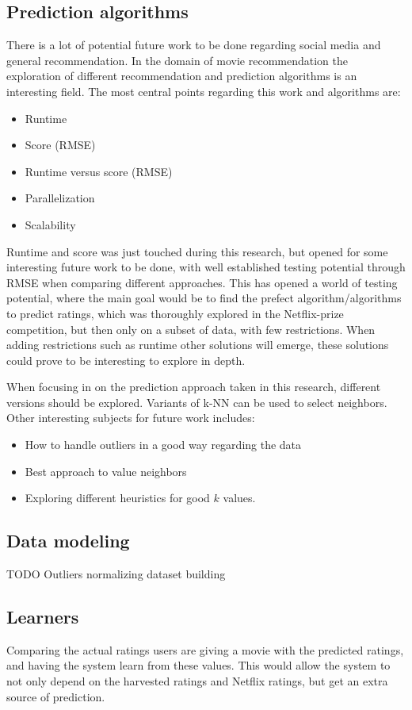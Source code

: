 \subsection{Prediction algorithms}
There is a lot of potential future work to be done regarding social media and general recommendation. In the domain of movie recommendation the exploration of different recommendation and prediction algorithms is an interesting field. The most central points regarding this work and algorithms are:
\begin{itemize}
    \item Runtime
    \item Score (RMSE)
    \item Runtime versus score (RMSE)
    \item Parallelization
    \item Scalability
\end{itemize}
Runtime and score was just touched during this research, but opened for some interesting future work to be done, with well established testing potential through RMSE when comparing different approaches. This has opened a world of testing potential, where the main goal would be to find the prefect algorithm/algorithms to predict ratings, which was thoroughly explored in the Netflix-prize competition, but then only on a subset of data, with few restrictions. When adding restrictions such as runtime other solutions will emerge, these solutions could prove to be interesting to explore in depth.

When focusing in on the prediction approach taken in this research, different versions should be explored. Variants of k-NN can be used to select neighbors. Other interesting subjects for future work includes:
\begin{itemize}
    \item How to handle outliers in a good way regarding the data
    \item Best approach to value neighbors
    \item Exploring different heuristics for good $k$ values.
\end{itemize}

\subsection{Data modeling}
TODO
Outliers  normalizing dataset building


\subsection{Learners}
Comparing the actual ratings users are giving a movie with the predicted ratings, and having the system learn from these values. This would allow the system to not only depend on the harvested ratings and Netflix ratings, but get an extra source of prediction.

